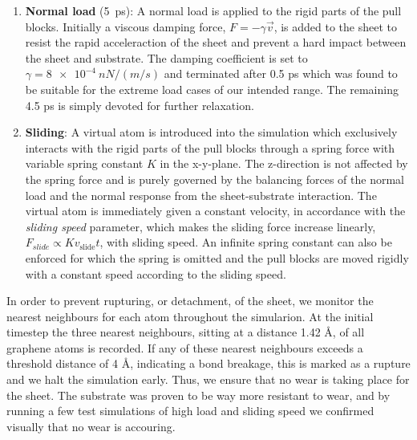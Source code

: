 \begin{enumerate}
  \item \textbf{Normal load} (\SI{5}{ps}): A normal load is applied to the rigid
  parts of the pull blocks. Initially a viscous damping force, $F = -\gamma \vec{v}$, is added to the sheet to resist the rapid acceleraction of the sheet and prevent a hard impact between the sheet and substrate. The damping coefficient is set to $\gamma = \SI{8e-4}{nN/(m/s)}$ and terminated after 0.5 ps which was found to be suitable for the extreme load cases of our intended range. The remaining 4.5 ps is simply devoted for further relaxation. 
  \item \textbf{Sliding}: A virtual atom is introduced into the simulation which
  exclusively interacts with the rigid parts of the pull blocks through a spring force
  with variable spring constant $K$ in the x-y-plane. The z-direction is not
  affected by the spring force and is purely governed by the balancing forces of the normal load and the normal response from the sheet-substrate interaction. The
  virtual atom is immediately given a constant velocity, in accordance with
  the \textit{sliding speed} parameter, which makes the sliding force increase linearly, $F_{\textit{slide}} \propto Kv_{\text{slide}}t$, with sliding speed. An infinite spring constant can also be enforced for which the spring is omitted and the pull blocks are moved rigidly with a constant speed according to the sliding speed.
\end{enumerate}
In order to prevent rupturing, or detachment, of the sheet, we monitor the nearest neighbours for each atom throughout the simularion. At the initial timestep the three nearest neighbours, sitting at a distance 1.42 Å, of all graphene atoms is recorded. If any of these nearest neighbours exceeds a threshold distance of 4 Å, indicating a bond breakage, this is marked as a rupture and we halt the simulation early. Thus, we ensure that no wear is taking place for the sheet. The substrate was proven to be way more resistant to wear, and by running a few test simulations of high load and sliding speed we confirmed visually that no wear is accouring.

